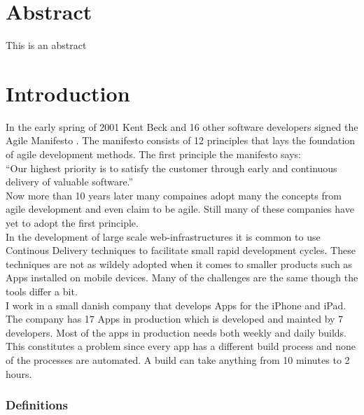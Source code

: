 \documentclass{ituthesis}
\begin{document}

\frontmatter

\thetitlepage

\chapter*{Abstract}
This is an abstract

\clearpage
\setcounter{tocdepth}{1}

\mainmatter

\midsloppy
\sloppybottom

\chapter{Introduction}

In the early spring of 2001 Kent Beck and 16 other software developers signed the Agile Manifesto \cite{beck2001agile}. The manifesto consists of 12 principles that lays the foundation of agile development methods. The first principle the manifesto says:\\

``Our highest priority is to satisfy the customer through early and continuous delivery
of valuable software.'' \cite{beck2001agile}\\

Now more than 10 years later many compaines adopt many the concepts from agile development and even claim to be agile. Still many of these companies have yet to adopt the first principle.\\

In the development of large scale web-infrastructures it is common to use Continous Delivery techniques to facilitate small rapid development cycles. These techniques are not as wildely adopted when it comes to smaller products such as Apps installed on mobile devices. Many of the challenges are the same though the tools differ a bit.\\

I work in a small danish company that develops Apps for the iPhone and iPad. The company has 17 Apps in production which is developed and mainted by 7 developers. Most of the apps in production needs both weekly and daily builds. This constitutes a problem since every app has a different build process and none of the processes are automated. A build can take anything from 10 minutes to 2 hours. \cite{Humble2006}

\subsection{Definitions}
\end{document}
